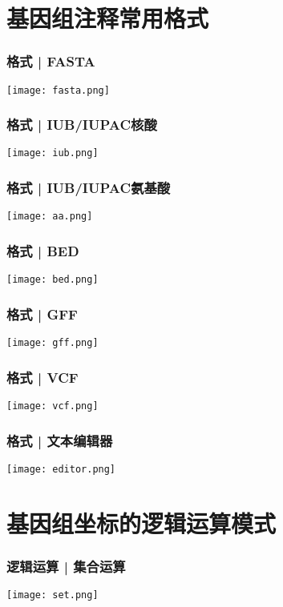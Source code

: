 \section{基因组注释常用格式}
\begin{frame}
	\frametitle{格式 | FASTA}
		\begin{center}
			\texttt{[image: fasta.png]}
		\end{center}
\end{frame}

\begin{frame}
	\frametitle{格式 | IUB/IUPAC核酸}
		\begin{center}
			\texttt{[image: iub.png]}
		\end{center}
\end{frame}

\begin{frame}
	\frametitle{格式 | IUB/IUPAC氨基酸}
		\begin{center}
			\texttt{[image: aa.png]}
		\end{center}
\end{frame}

\begin{frame}
	\frametitle{格式 | BED}
		\begin{center}
			\texttt{[image: bed.png]}
		\end{center}
\end{frame}

\begin{frame}
	\frametitle{格式 | GFF}
		\begin{center}
			\texttt{[image: gff.png]}
		\end{center}
\end{frame}

\begin{frame}
	\frametitle{格式 | VCF}
		\begin{center}
			\texttt{[image: vcf.png]}
		\end{center}
\end{frame}

\begin{frame}
	\frametitle{格式 | 文本编辑器}
		\begin{center}
			\texttt{[image: editor.png]}
		\end{center}
\end{frame}

\section{基因组坐标的逻辑运算模式}
\begin{frame}
	\frametitle{逻辑运算 | 集合运算}
		\begin{center}
			\texttt{[image: set.png]}
		\end{center}
\end{frame}

